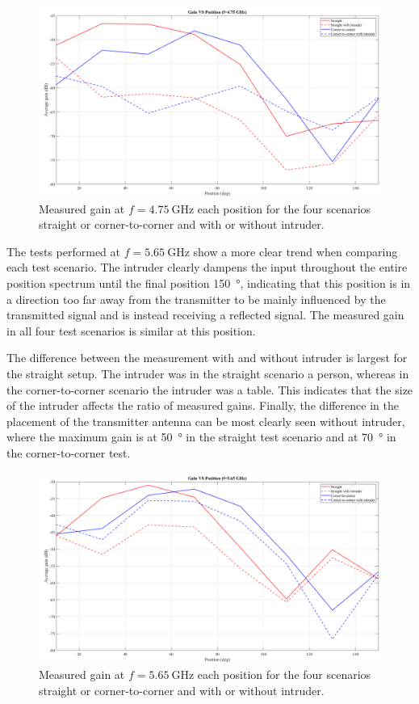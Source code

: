 \begin{figure}[H]
    \centering
    \includegraphics[width=1\textwidth]{figures/gain_vs_pos_475.png}
    \caption{Measured gain at $f=\SI{4.75}{\giga\hertz}$ each position for the four scenarios straight or corner-to-corner and with or without intruder.} 
    \label{fig:gain_vs_pos_475}
\end{figure}

The tests performed at $f=\SI{5.65}{\giga\hertz}$ show a more clear trend when comparing each test scenario. The intruder clearly dampens the input throughout the entire position spectrum until the final position \SI{150}{\degree}, indicating that this position is in a direction too far away from the transmitter to be mainly influenced by the transmitted signal and is instead receiving a reflected signal. The measured gain in all four test scenarios is similar at this position. 

The difference between the measurement with and without intruder is largest for the straight setup. The intruder was in the straight scenario a person, whereas in the corner-to-corner scenario the intruder was a table. This indicates that the size of the intruder affects the ratio of measured gains. Finally, the difference in the placement of the transmitter antenna can be most clearly seen without intruder, where the maximum gain is at \SI{50}{\degree} in the straight test scenario and at \SI{70}{\degree} in the corner-to-corner test. 

\begin{figure}[H]
    \centering
    \includegraphics[width=1\textwidth]{figures/gain_vs_pos_565.png}
    \caption{Measured gain at $f=\SI{5.65}{\giga\hertz}$ each position for the four scenarios straight or corner-to-corner and with or without intruder.} 
    \label{fig:gain_vs_pos_565}
\end{figure}

